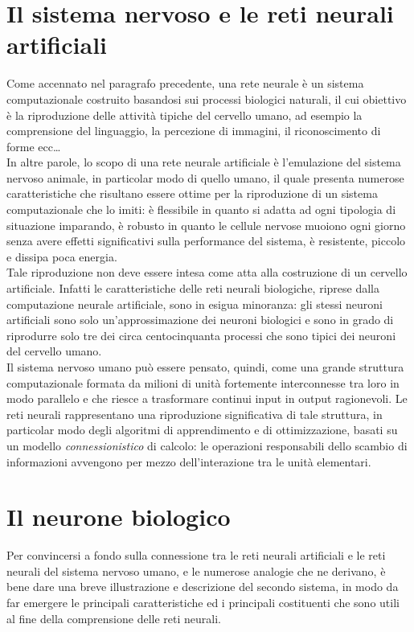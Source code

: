 \documentclass[12pt,a4paper,oneside]{book}
\begin{document}
		
		
		\section{Il sistema nervoso e le reti neurali artificiali}
	
		Come accennato nel paragrafo precedente, una rete neurale è un sistema computazionale costruito basandosi sui processi biologici naturali, il cui obiettivo è la riproduzione delle attività tipiche del cervello umano, ad esempio la comprensione del linguaggio, la percezione di immagini, il riconoscimento di forme ecc\dots \\
		In altre parole, lo scopo di una rete neurale artificiale è l’emulazione del sistema nervoso animale, in particolar modo di quello umano, il quale presenta numerose caratteristiche che risultano essere ottime per la riproduzione di un sistema computazionale che lo imiti: è flessibile in quanto si adatta ad ogni tipologia di situazione imparando, è robusto in quanto le cellule nervose muoiono ogni giorno senza avere effetti significativi sulla performance del sistema, è resistente, piccolo e dissipa poca energia. \\
		Tale riproduzione non deve essere intesa come atta alla costruzione di un cervello artificiale. Infatti le caratteristiche delle reti neurali biologiche, riprese dalla computazione neurale artificiale, sono in esigua minoranza: gli stessi neuroni artificiali sono solo un’approssimazione dei neuroni biologici e sono in grado di riprodurre solo tre dei circa centocinquanta processi che sono tipici dei neuroni del cervello umano.\\
		Il sistema nervoso umano può essere pensato, quindi, come una grande struttura computazionale formata da milioni di unità fortemente interconnesse tra loro in modo parallelo e che riesce a trasformare continui input in output ragionevoli. Le reti neurali rappresentano una riproduzione significativa di tale struttura, in particolar modo degli algoritmi di apprendimento e di ottimizzazione, basati su un modello \emph{connessionistico} di calcolo: le operazioni responsabili dello scambio di informazioni avvengono per mezzo dell'interazione tra le unità elementari.
		
		
		
		\section{Il neurone biologico}
		Per convincersi a fondo sulla connessione tra le reti neurali artificiali e le reti neurali del sistema nervoso umano, e le numerose analogie che ne derivano, è bene dare una breve illustrazione e descrizione del secondo sistema, in modo da far emergere le principali caratteristiche ed i principali costituenti che sono utili al fine della comprensione delle reti neurali.
     	
\end{document}
